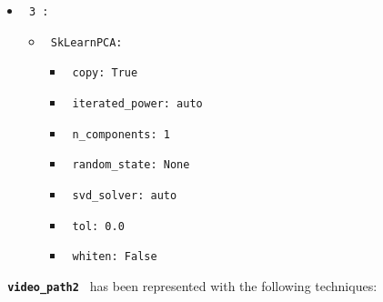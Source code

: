 \documentclass[11pt]{article}
\begin{document}
\begin{itemize}
\begin{itemize}
           \end{itemize}
    \item
     \verb| 3 :|
     \begin{itemize}
             \item
            \verb| SkLearnPCA: |

                   \begin{itemize}
                                    \item
                        \verb| copy: True |
                                    \item
                        \verb| iterated_power: auto |
                                    \item
                        \verb| n_components: 1 |
                                    \item
                        \verb| random_state: None |
                                    \item
                        \verb| svd_solver: auto |
                                    \item
                        \verb| tol: 0.0 |
                                    \item
                        \verb| whiten: False |
                            \end{itemize}
       
           \end{itemize}
\end{itemize}
\hfill\break
\hfill\break



\textbf{\lstinline[style=verbatim-text]| video_path2 |} has been represented with the following techniques:
\hfill\break
\hfill\break
\end{document}

